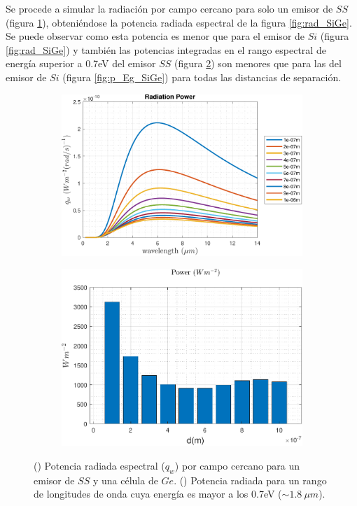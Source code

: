 Se procede a simular la radiación por campo cercano para solo un emisor de $SS$ (figura \ref{fig:SsGe}), obteniéndose la potencia radiada espectral de la figura \ref{fig:rad_SiGe}. Se puede observar como esta potencia es menor que para el emisor de $Si$ (figura \ref{fig:rad_SiGe}) y también las potencias integradas en el rango espectral de energía superior a 0.7eV del emisor $SS$ (figura \ref{fig:p_Eg_SsGe}) son menores que para las del emisor de $Si$ (figura \ref{fig:p_Eg_SiGe}) para todas las distancias de separación.
\begin{figure}[H]
	\centering
	\begin{subfigure}[b]{0.49\textwidth}
	\centering
		\includegraphics[width=1.00\textwidth]{figuras/Resultados/radiacion/SsGe.pdf}
	\caption{ }
	\label{fig:SsGe}
\end{subfigure}
\begin{subfigure}[b]{0.49\textwidth}
	\centering
		\includegraphics[width=1.00\textwidth]{figuras/Resultados/radiacion/p_Eg_SsGe.pdf}
	\caption{ }
	\label{fig:p_Eg_SsGe}
\end{subfigure}
\caption{() Potencia radiada espectral ($q_w$) por campo cercano para un emisor de $SS$ y una célula de $Ge$. () Potencia radiada para un rango de longitudes de onda cuya energía es mayor a los 0.7eV ($\sim 1.8 \ \mu m$).}
	\label{fig:rad_SsGe}
\end{figure}
